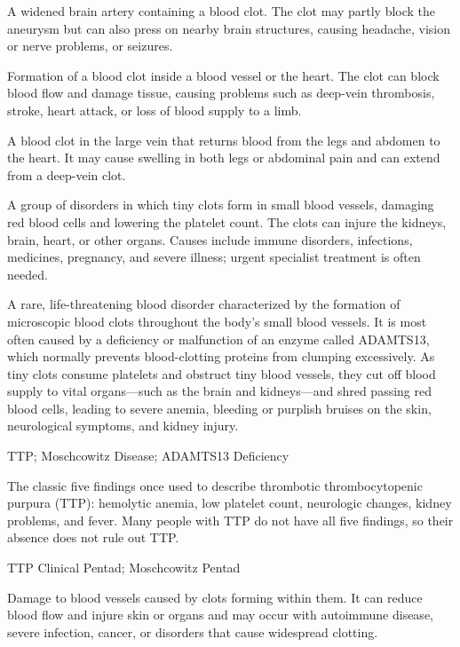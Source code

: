  A widened brain artery containing a blood clot. The clot may partly block the aneurysm but can also press on nearby brain structures, causing headache, vision or nerve problems, or seizures.

 Formation of a blood clot inside a blood vessel or the heart. The clot can block blood flow and damage tissue, causing problems such as deep-vein thrombosis, stroke, heart attack, or loss of blood supply to a limb.

 A blood clot in the large vein that returns blood from the legs and abdomen to the heart. It may cause swelling in both legs or abdominal pain and can extend from a deep-vein clot.

 A group of disorders in which tiny clots form in small blood vessels, damaging red blood cells and lowering the platelet count. The clots can injure the kidneys, brain, heart, or other organs. Causes include immune disorders, infections, medicines, pregnancy, and severe illness; urgent specialist treatment is often needed.

 A rare, life-threatening blood disorder characterized by the formation of microscopic blood clots throughout the body's small blood vessels. It is most often caused by a deficiency or malfunction of an enzyme called ADAMTS13, which normally prevents blood-clotting proteins from clumping excessively. As tiny clots consume platelets and obstruct tiny blood vessels, they cut off blood supply to vital organs---such as the brain and kidneys---and shred passing red blood cells, leading to severe anemia, bleeding or purplish bruises on the skin, neurological symptoms, and kidney injury.


\synonyms
TTP; Moschcowitz Disease; ADAMTS13 Deficiency

 The classic five findings once used to describe thrombotic thrombocytopenic purpura (TTP): hemolytic anemia, low platelet count, neurologic changes, kidney problems, and fever. Many people with TTP do not have all five findings, so their absence does not rule out TTP.

\synonyms
TTP Clinical Pentad; Moschcowitz Pentad

 Damage to blood vessels caused by clots forming within them. It can reduce blood flow and injure skin or organs and may occur with autoimmune disease, severe infection, cancer, or disorders that cause widespread clotting.

